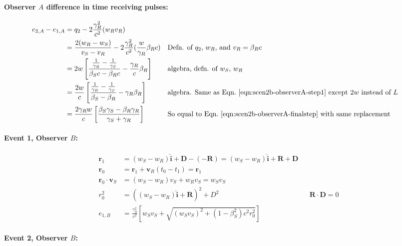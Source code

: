 \documentclass[a4paper]{article}
\theoremstyle{plain}
\theoremstyle{definition}
\newcommand{\vect}[1]{\mathbf{#1}}
\newcommand{\hatvec}[1]{\hat{\mathbf{#1}}}
\begin{document}
\paragraph{Observer $A$ difference in time receiving pulses:}

\begin{align*}
e_{2,A} - e_{1,A}
  & = q_2 - 2\frac{\gamma_R^2}{c^2} (w_R v_R) \\
  & = \frac{2(w_R-w_S)}{v_S - v_R} - 2\frac{\gamma_R^2}{c^2} ( \frac{w}{\gamma_R} \beta_R c ) & & \text{Defn. of $q_2$, $w_R$, and $v_R = \beta_R c$} \\
  & = 2w \left[ \frac{\frac{1}{\gamma_R} - \frac{1}{\gamma_S}}{\beta_S c - \beta_R c} - \frac{\gamma_R}{c} \beta_R \right] & & \text{algebra, defn. of $w_S$, $w_R$} \\
  & = \frac{2w}{c} \left[ \frac{\frac{1}{\gamma_R} - \frac{1}{\gamma_S}}{\beta_S-\beta_R} - \gamma_R \beta_R \right] & & \text{algebra. Same as Eqn.~\eqref{eqn:scen2b-observerA-step1} except $2w$ instead of $L$} \\
  & = \frac{2\gamma_R w}{c} \left[ \frac{\beta_S\gamma_S - \beta_R\gamma_R}{\gamma_S + \gamma_R} \right] & & \text{So equal to Eqn.~\eqref{eqn:scen2b-observerA-finalstep} with same replacement}
\end{align*}


\paragraph{Event 1, Observer $B$:}

\begin{align*}
\vect{r}_1 & = (w_S - w_R)\hatvec{i} + \vect{D} - (-\vect{R}) = (w_S - w_R)\hatvec{i} + \vect{R} + \vect{D} \\
\vect{r}_0 & = \vect{r}_1 + \vect{v}_R (t_0 - t_1) = \vect{r}_1 \\
\vect{r}_0 \cdot \vect{v}_S & = (w_S - w_R)v_S + w_Rv_S = w_Sv_S \\
r_0^2 & = ((w_S-w_R)\hatvec{i} + \vect{R})^2 + D^2 & & \text{$\vect{R} \cdot \vect{D} = 0$} \\
e_{1,B} & = \frac{\gamma_S^2}{c^2} \left[ w_Sv_S + \sqrt{ (w_Sv_S)^2 + (1-\beta_S^2)c^2r_0^2 } \right]
\end{align*}


\paragraph{Event 2, Observer $B$:}
\end{document}
